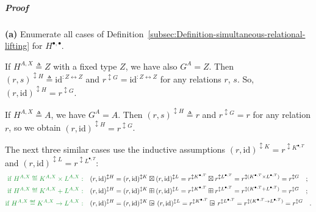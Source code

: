 \subparagraph{Proof}

\textbf{(a)} Enumerate all cases of Definition~\ref{subsec:Definition-simultaneous-relational-lifting}
for $H^{\bullet,\bullet}$.

If $H^{A,X}\triangleq Z$ with a fixed type $Z$, we have also $G^{A}=Z$.
Then $(r,s)^{\updownarrow H}\triangleq\text{id}^{:Z\leftrightarrow Z}$
and $r^{\updownarrow G}=\text{id}^{:Z\leftrightarrow Z}$ for any
relations $r$, $s$. So, $(r,\text{id})^{\updownarrow H}=r^{\updownarrow G}$.

If $H^{A,X}\triangleq A$, we have $G^{A}=A$. Then $(r,s)^{\updownarrow H}\triangleq r$
and $r^{\updownarrow G}=r$ for any relation $r$, so we obtain $(r,\text{id})^{\updownarrow H}=r^{\updownarrow G}$.

The next three similar cases use the inductive assumptions $(r,\text{id})^{\updownarrow K}=r^{\updownarrow K^{\bullet,T}}$
and $(r,\text{id})^{\updownarrow L}=r^{\updownarrow L^{\bullet,T}}$:
\begin{align*}
{\color{greenunder}\text{if }H^{A,X}\triangleq K^{A,X}\times L^{A,X}:}\quad & (r,\text{id})^{\updownarrow H}=(r,\text{id})^{\updownarrow K}\boxtimes(r,\text{id})^{\updownarrow L}=r^{\updownarrow K^{\bullet,T}}\boxtimes r^{\updownarrow L^{\bullet,T}}=r^{\updownarrow(K^{\bullet,T}\times L^{\bullet,T})}=r^{\updownarrow G}\quad;\\
{\color{greenunder}\text{if }H^{A,X}\triangleq K^{A,X}+L^{A,X}:}\quad & (r,\text{id})^{\updownarrow H}=(r,\text{id})^{\updownarrow K}\boxplus(r,\text{id})^{\updownarrow L}=r^{\updownarrow K^{\bullet,T}}\boxplus r^{\updownarrow L^{\bullet,T}}=r^{\updownarrow(K^{\bullet,T}+L^{\bullet,T})}=r^{\updownarrow G}\quad;\\
{\color{greenunder}\text{if }H^{A,X}\triangleq K^{A,X}\rightarrow L^{A,X}:}\quad & (r,\text{id})^{\updownarrow H}=(r,\text{id})^{\updownarrow K}\ogreaterthan(r,\text{id})^{\updownarrow L}=r^{\updownarrow K^{\bullet,T}}\ogreaterthan r^{\updownarrow L^{\bullet,T}}=r^{\updownarrow(K^{\bullet,T}\rightarrow L^{\bullet,T})}=r^{\updownarrow G}\quad.
\end{align*}

